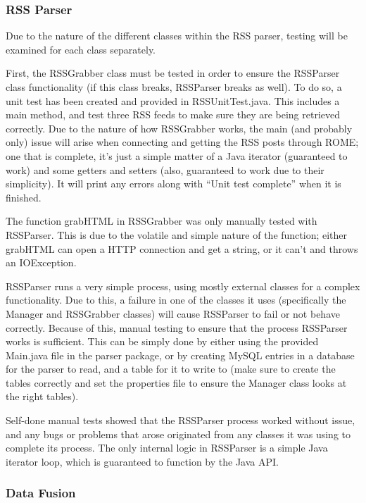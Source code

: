 \documentclass[11pt]{article} %
\begin{document}
\subsubsection{RSS Parser}

Due to the nature of the different classes within the RSS parser, testing will be examined for each class separately.

First, the RSSGrabber class must be tested in order to ensure the RSSParser class functionality (if this class breaks, RSSParser breaks as well). To do so, a unit test has been created and provided in RSSUnitTest.java. This includes a main method, and test three RSS feeds to make sure they are being retrieved correctly. Due to the nature of how RSSGrabber works, the main (and probably only) issue will arise when connecting and getting the RSS posts through ROME; one that is complete, it’s just a simple matter of a Java iterator (guaranteed to work) and some getters and setters (also, guaranteed to work due to their simplicity). It will print any errors along with “Unit test complete” when it is finished.

The function grabHTML in RSSGrabber was only manually tested with RSSParser. This is due to the volatile and simple nature of the function; either grabHTML can open a HTTP connection and get a string, or it can’t and throws an IOException.

RSSParser runs a very simple process, using mostly external classes for a complex functionality. Due to this, a failure in one of the classes it uses (specifically the Manager and RSSGrabber classes) will cause RSSParser to fail or not behave correctly. Because of this, manual testing to ensure that the process RSSParser works is sufficient. This can be simply done by either using the provided Main.java file in the parser package, or by creating MySQL entries in a database for the parser to read, and a table for it to write to (make sure to create the tables correctly and set the properties file to ensure the Manager class looks at the right tables).

Self-done manual tests showed that the RSSParser process worked without issue, and any bugs or problems that arose originated from any classes it was using to complete its process. The only internal logic in RSSParser is a simple Java iterator loop, which is guaranteed to function by the Java API.

\subsubsection{Data Fusion}
\end{document}
